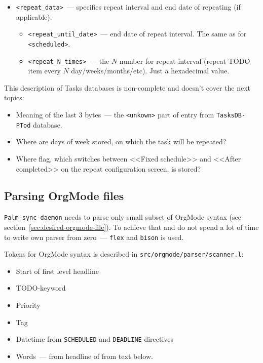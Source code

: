 \documentclass[a4paper,12pt,oneside]{scrartcl}
\begin{document}
\begin{itemize}
\begin{itemize}
  \item \texttt{<repeat\_data>}~--- specifies repeat interval and end date of
    repeating (if applicable).
    \begin{itemize}
    \item \texttt{<repeat\_until\_date>}~--- end date of repeat interval. The
      same as for \texttt{<scheduled>}.
    \item \texttt{<repeat\_N\_times>}~--- the $N$ number for repeat interval
      (repeat TODO item every $N$ day/weeks/months/etc). Just a hexadecimal
      value.
    \end{itemize}
  \end{itemize}
\end{itemize}

This description of Tasks databases is non-complete and doesn't cover the next
topics:
\begin{itemize}
\item Meaning of the last 3 bytes~--- the \texttt{<unkown>} part of entry from
  \texttt{TasksDB-PTod} database.
\item Where are days of week stored, on which the task will be repeated?
\item Where flag, which switches between <<Fixed schedule>> and <<After
  completed>> on the repeat configuration screen, is stored?
\end{itemize}

\subsection{Parsing OrgMode files}
\label{sec:pars-orgm-files}

\texttt{Palm-sync-daemon} needs to parse only small subset of OrgMode syntax
(see section~\ref{sec:desired-orgmode-file}). To achieve that and do not spend a
lot of time to write own parser from zero~--- \texttt{flex} and \texttt{bison}
is used.

Tokens for OrgMode syntax is described in \texttt{src/orgmode/parser/scanner.l}:
\begin{itemize}
\item Start of first level headline
\item TODO-keyword
\item Priority
\item Tag
\item Datetime from \texttt{SCHEDULED} and \texttt{DEADLINE} directives
\item Words~--- from headline of from text below.
\end{itemize}
\end{document}
